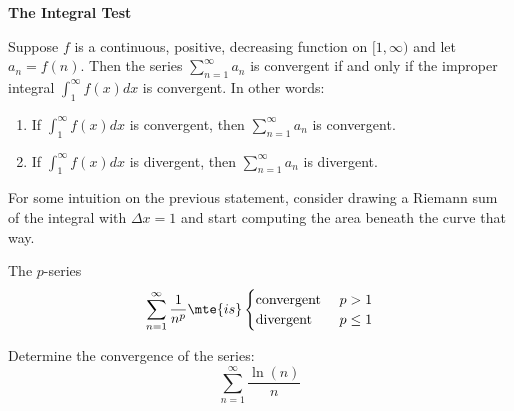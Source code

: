 
\chead{\today}
\graphicspath{ {\string~/Desktop} }
\usetikzlibrary{arrows}
\newcommand{\ans}[1]{ \noindent {\color{red} \textbf{Answer:} #1}}
\renewcommand{\ans}[1]{\vspace{3in}}

\begin{center}
\textbf{The Integral Test}
\end{center}

\begin{thm}
Suppose $f$ is a continuous, positive, decreasing function on $[1, \infty)$ and let $a_n=f(n)$. Then the series $\sum_{n=1}^{\infty} a_n$ is convergent if and only if the improper integral $\int_1^{\infty} f(x) d x$ is convergent. In other words:
\begin{enumerate}[label= \roman*.]
\item If $\int_1^{\infty} f(x) d x$ is convergent, then $\sum_{n=1}^{\infty} a_n$ is convergent.
\item If $\int_1^{\infty} f(x) d x$ is divergent, then $\sum_{n=1}^{\infty} a_n$ is divergent. 
\end{enumerate}
\end{thm}

\begin{aun}
For some intuition on the previous statement, consider drawing a Riemann sum of the integral with $\Delta x = 1$ and start computing the area beneath the curve that way. 
\end{aun}

\begin{thm}
The $p$-series 
\[
\sum_{n = 1}^\infty \frac{1}{n^p} \mte{ is } \begin{cases}
\text{convergent } & p > 1\\
\text{divergent } & p \leq 1
\end{cases}
\]
\end{thm}

\begin{exx}
Determine the convergence of the series:
\[
\sum_{n = 1}^\infty \frac{\ln(n)}{n}
\]
\end{exx}

